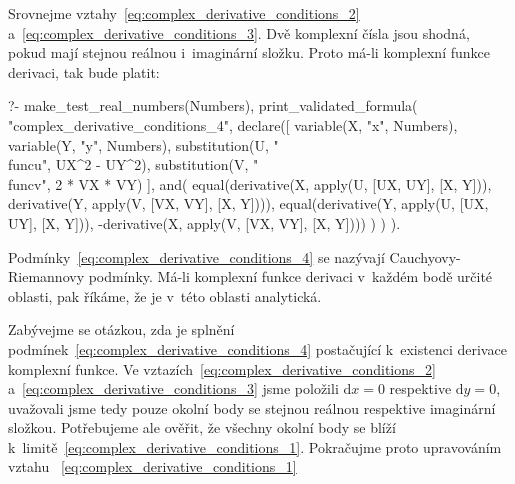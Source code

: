 Srovnejme vztahy~\eqref{eq:complex_derivative_conditions_2} a~\eqref{eq:complex_derivative_conditions_3}. Dvě komplexní čísla jsou shodná, pokud mají stejnou reálnou i~imaginární složku. Proto má-li komplexní funkce derivaci, tak bude platit:

\begin{prolog}
?-	make_test_real_numbers(Numbers),
	print_validated_formula(
		"complex_derivative_conditions_4",
		declare([
			variable(X, "x", Numbers),
			variable(Y, "y", Numbers),
			substitution(U, "\\func{u}", UX^2 - UY^2),
			substitution(V, "\\func{v}", 2 * VX * VY)
		],
			and(
				equal(derivative(X, apply(U, [UX, UY], [X, Y])), derivative(Y, apply(V, [VX, VY], [X, Y]))),
				equal(derivative(Y, apply(U, [UX, UY], [X, Y])), -derivative(X, apply(V, [VX, VY], [X, Y])))
			)
		)
	).
\end{prolog}

Podmínky~\eqref{eq:complex_derivative_conditions_4} se nazývají Cauchyovy-Riemannovy podmínky. 
Má-li komplexní funkce derivaci v~každém bodě určité oblasti, pak říkáme, že je v~této oblasti analytická.

Zabývejme se otázkou, zda je splnění podmínek~\eqref{eq:complex_derivative_conditions_4} postačující k~existenci derivace komplexní funkce. Ve vztazích~\eqref{eq:complex_derivative_conditions_2} a~\eqref{eq:complex_derivative_conditions_3} jsme položili \(\mathrm{d}x = 0\) respektive \(\mathrm{d}y = 0\), uvažovali jsme tedy pouze okolní body se stejnou reálnou respektive imaginární složkou. Potřebujeme ale ověřit, že všechny okolní body se blíží k~limitě~\eqref{eq:complex_derivative_conditions_1}. Pokračujme proto upravováním vztahu
~\eqref{eq:complex_derivative_conditions_1}


